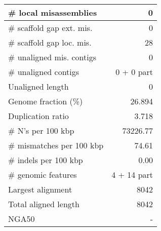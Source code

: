 \documentclass[12pt,a4paper]{article}
\begin{document}
\begin{table}[ht]
\begin{center}
\begin{tabular}{|l*{1}{|r}|}
\# local misassemblies & 0 \\ \hline
\# scaffold gap ext. mis. & 0 \\ \hline
\# scaffold gap loc. mis. & 28 \\ \hline
\# unaligned mis. contigs & 0 \\ \hline
\# unaligned contigs & 0 + 0 part \\ \hline
Unaligned length & 0 \\ \hline
Genome fraction (\%) & 26.894 \\ \hline
Duplication ratio & 3.718 \\ \hline
\# N's per 100 kbp & 73226.77 \\ \hline
\# mismatches per 100 kbp & 74.61 \\ \hline
\# indels per 100 kbp & 0.00 \\ \hline
\# genomic features & 4 + 14 part \\ \hline
Largest alignment & 8042 \\ \hline
Total aligned length & 8042 \\ \hline
NGA50 & - \\ \hline
\end{tabular}
\end{center}
\end{table}
\end{document}
